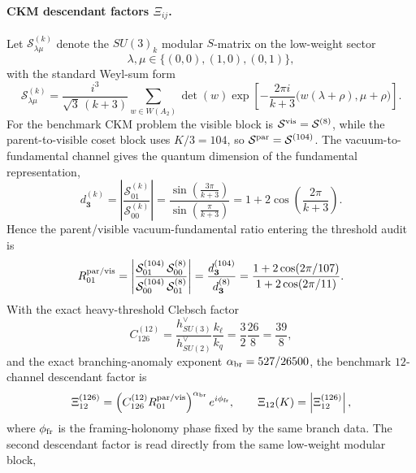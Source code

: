 \documentclass[11pt]{article}
\begin{document}
\paragraph{CKM descendant factors $\Xi_{ij}$.}
Let $\mathcal S^{(k)}_{\lambda\mu}$ denote the $SU(3)_k$ modular $S$-matrix on the low-weight sector
\begin{equation}
 \lambda,\mu\in\{(0,0),(1,0),(0,1)\},
\end{equation}
with the standard Weyl-sum form
\begin{equation}
 \mathcal S^{(k)}_{\lambda\mu}
 =
 \frac{i^3}{\sqrt3\,(k+3)}
 \sum_{w\in W(A_2)}
 \det(w)
 \exp\!\left[-\frac{2\pi i}{k+3}\bigl(w(\lambda+\rho),\mu+\rho\bigr)\right].
\end{equation}
For the benchmark CKM problem the visible block is $\mathcal S^{\rm vis}=\mathcal S^{(8)}$, while the parent-to-visible coset block uses $K/3=104$, so $\mathcal S^{\rm par}=\mathcal S^{(104)}$. The vacuum-to-fundamental channel gives the quantum dimension of the fundamental representation,
\begin{equation}
 d_{\mathbf 3}^{(k)}
 =
 \left|\frac{\mathcal S^{(k)}_{01}}{\mathcal S^{(k)}_{00}}\right|
 =
 \frac{\sin\!\left(\frac{3\pi}{k+3}\right)}{\sin\!\left(\frac{\pi}{k+3}\right)}
 =
 1+2\cos\!\left(\frac{2\pi}{k+3}\right).
\end{equation}
Hence the parent/visible vacuum-fundamental ratio entering the threshold audit is
\begin{equation}
 R_{01}^{\rm par/vis}
 =
 \left|\frac{\mathcal S^{(104)}_{01}\,\mathcal S^{(8)}_{00}}{\mathcal S^{(104)}_{00}\,\mathcal S^{(8)}_{01}}\right|
 =
 \frac{d_{\mathbf 3}^{(104)}}{d_{\mathbf 3}^{(8)}}
 =
 \frac{1+2\cos(2\pi/107)}{1+2\cos(2\pi/11)}.
\end{equation}
With the exact heavy-threshold Clebsch factor
\begin{equation}
 C_{126}^{(12)}
 =
 \frac{h^{\vee}_{SU(3)}}{h^{\vee}_{SU(2)}}\frac{k_{\ell}}{k_q}
 =
 \frac{3}{2}\frac{26}{8}
 =
 \frac{39}{8},
\end{equation}
and the exact branching-anomaly exponent $\alpha_{\rm br}=527/26500$, the benchmark $12$-channel descendant factor is
\begin{equation}
 \Xi_{12}^{(126)}
 =
 \left(C_{126}^{(12)}R_{01}^{\rm par/vis}\right)^{\alpha_{\rm br}}e^{i\phi_{\rm fr}},
 \qquad
 \Xi_{12}(K)=\left|\Xi_{12}^{(126)}\right|,
\end{equation}
where $\phi_{\rm fr}$ is the framing-holonomy phase fixed by the same branch data. The second descendant factor is read directly from the same low-weight modular block,
\end{document}
